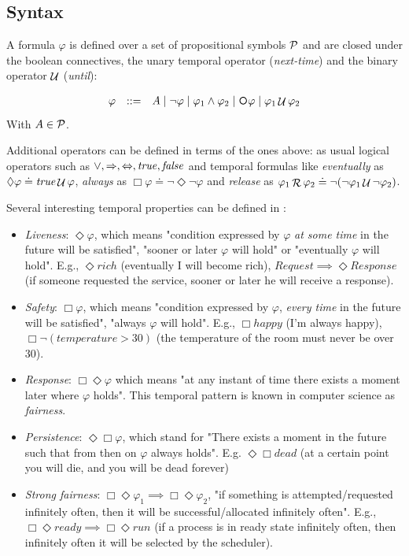 \subsection{Syntax}
A \LTL formula $\varphi$ is defined over a set of propositional symbols $\mathcal{P}$ and are closed under the boolean connectives, the unary temporal operator \Next (\emph{next-time}) and the binary operator $\mathop{\mathcal{U}}$ (\emph{until}):

\[\begin{array}{rcl}
\varphi &::=& A \mid \lnot \varphi \mid \varphi_1\land \varphi_2 \mid \Next\varphi \mid \varphi_1 \lUntil \varphi_2
\end{array}
\]
With $A\in \mathcal{P}$.

Additional operators can be defined in terms of the ones above: as usual logical operators such as $\vee, \Rightarrow, \Leftrightarrow, \mathit{true}, \mathit{false}$ and temporal formulas like \emph{eventually} as $\Diamond \varphi \doteq \mathit{true} \mathop{\mathcal{U}} \varphi$, \emph{always} as $\Box \varphi \doteq \lnot \Diamond \lnot \varphi$ and \emph{release} as $\varphi_1 \mathop{\mathcal{R}} \varphi_2 \doteq \lnot (\lnot \varphi_1 \mathop{\mathcal{U}} \lnot \varphi_2)$.

\begin{example}\label{ltl-formula-examples}
Several interesting temporal properties can be defined in \LTL:
\begin{itemize}
	\item \emph{Liveness}: $\Diamond \varphi$, which means "condition expressed by $\varphi$ \emph{at some time} in the future will be satisfied", "sooner or later $\varphi$ will hold" or "eventually $\varphi$ will hold". E.g., $\Diamond rich$ (eventually I will become rich), $Request \implies \Diamond Response$ (if someone requested the service, sooner or later he will receive a response).
	\item \emph{Safety}: $\Box \varphi$, which means "condition expressed by $\varphi$, \emph{every time} in the future will be satisfied", "always $\varphi$ will hold". E.g., $\Box happy$ (I'm always happy), $\Box \lnot (temperature >30)$ (the temperature of the room must never be over 30).
	\item \emph{Response}: $\Box \Diamond \varphi$ which means "at any instant of time there exists a moment later where $\varphi$ holds". This temporal pattern is known in computer science as \emph{fairness}.
	\item \emph{Persistence}: $\Diamond \Box \varphi$, which stand for "There exists a moment in the future such that from then on $\varphi$ always holds". E.g. $\Diamond \Box dead$ (at a certain point you will die, and you will be dead forever)
	\item \emph{Strong fairness}: $\Box \Diamond \varphi_1 \implies \Box \Diamond \varphi_2$, "if something is attempted/requested infinitely often, then it will be successful/allocated infinitely often". E.g., $\Box \Diamond ready \implies \Box \Diamond run$ (if a process is in ready state infinitely often, then infinitely often it will be selected by the scheduler).
\end{itemize}
\end{example}

